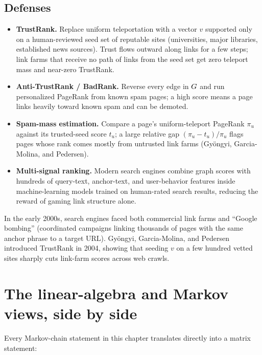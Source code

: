 \subsection{Defenses}

\begin{itemize}
  \item \textbf{TrustRank.} Replace uniform teleportation with a vector $v$ supported only on a human-reviewed seed set of reputable sites (universities, major libraries, established news sources). Trust flows outward along links for a few steps; link farms that receive no path of links from the seed set get zero teleport mass and near-zero TrustRank.
  \item \textbf{Anti-TrustRank / BadRank.} Reverse every edge in $G$ and run personalized PageRank from known spam pages; a high score means a page links heavily toward known spam and can be demoted.
  \item \textbf{Spam-mass estimation.} Compare a page's uniform-teleport PageRank $\pi_u$ against its trusted-seed score $t_u$; a large relative gap $(\pi_u - t_u)/\pi_u$ flags pages whose rank comes mostly from untrusted link farms (Gy\"ongyi, Garcia-Molina, and Pedersen).
  \item \textbf{Multi-signal ranking.} Modern search engines combine graph scores with hundreds of query-text, anchor-text, and user-behavior features inside machine-learning models trained on human-rated search results, reducing the reward of gaming link structure alone.
\end{itemize}

\begin{marginnotebox}
In the early 2000s, search engines faced both commercial link farms and ``Google bombing'' (coordinated campaigns linking thousands of pages with the same anchor phrase to a target URL). Gy\"ongyi, Garcia-Molina, and Pedersen introduced TrustRank in 2004, showing that seeding $v$ on a few hundred vetted sites sharply cuts link-farm scores across web crawls.
\end{marginnotebox}

\section{The linear-algebra and Markov views, side by side}
\label{ch36:twoviews}

Every Markov-chain statement in this chapter translates directly into a matrix statement:

